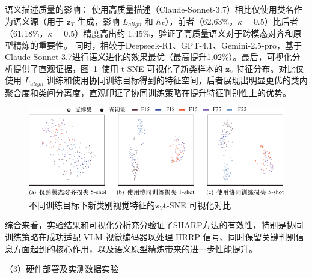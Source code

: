 语义描述质量的影响： 使用高质量描述（Claude-Sonnet-3.7）相比仅使用类名作为语义源（用于 $\mathbf{z}_T$ 生成，影响 $L_{align}$ 和 $h_F$），前者（62.63\%，$\kappa=0.5$）比后者（61.18\%，$\kappa=0.5$）精度高出约 1.45\%，验证了高质量语义对于跨模态对齐和原型精炼的重要性。 同时，相较于Deepseek-R1、GPT-4.1、Gemini-2.5-pro，基于Claude-Sonnet-3.7进行语义进化的效果最优（最高提升1.02\%）。最后，可视化分析提供了直观证据，图~\ref{fig:tsne_adapter_semantic}~使用 t-SNE 可视化了新类样本的 $\mathbf{z}_V$ 特征分布。对比仅使用 $L_{align}$ 训练和使用协同训练目标得到的特征空间，后者展现出明显更优的类内聚合度和类间分离度，直观印证了协同训练策略在提升特征判别性上的优势。


\begin{figure}[h!]
\centering
\includegraphics[width=\linewidth]{figures/tsne_pro3.pdf}
\caption{不同训练目标下新类别视觉特征的$\mathbf{z}_V$t-SNE 可视化对比} \label{fig:tsne_adapter_semantic} \end{figure}

综合来看，实验结果和可视化分析充分验证了SHARP方法的有效性，特别是协同训练策略在成功适配 VLM 视觉编码器以处理 HRRP 信号、同时保留关键判别信息方面起到的核心作用，以及语义原型精炼带来的进一步性能提升。

（3）硬件部署及实测数据实验

